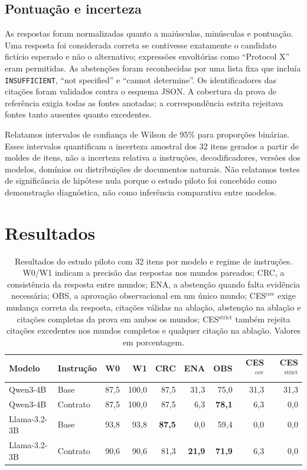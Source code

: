 \documentclass[10pt,twocolumn]{article}
\begin{document}
\subsection{Pontuação e incerteza}

As respostas foram normalizadas quanto a maiúsculas, minúsculas e pontuação. Uma resposta foi considerada correta se contivesse exatamente o candidato fictício esperado e não o alternativo; expressões envoltórias como ``Protocol X'' eram permitidas. As abstenções foram reconhecidas por uma lista fixa que incluía \texttt{INSUFFICIENT}, ``not specified'' e ``cannot determine''. Os identificadores das citações foram validados contra o esquema JSON. A cobertura da prova de referência exigia todas as fontes anotadas; a correspondência estrita rejeitava fontes tanto ausentes quanto excedentes.

Relatamos intervalos de confiança de Wilson de 95\% para proporções binárias. Esses intervalos quantificam a incerteza amostral dos 32 itens gerados a partir de moldes de itens, não a incerteza relativa a instruções, decodificadores, versões dos modelos, domínios ou distribuições de documentos naturais. Não relatamos testes de significância de hipótese nula porque o estudo piloto foi concebido como demonstração diagnóstica, não como inferência comparativa entre modelos.

\section{Resultados}

\begin{table}[t]
\centering
\small
\setlength{\tabcolsep}{5.2pt}
\caption{Resultados do estudo piloto com 32 itens por modelo e regime de instruções. W0/W1 indicam a precisão das respostas nos mundos pareados; CRC, a consistência da resposta entre mundos; ENA, a abstenção quando falta evidência necessária; OBS, a aprovação observacional em um único mundo; CES$^{\mathrm{cov}}$ exige mudança correta da resposta, citações válidas na ablação, abstenção na ablação e citações completas da prova em ambos os mundos; CES$^{\mathrm{strict}}$ também rejeita citações excedentes nos mundos completos e qualquer citação na ablação. Valores em porcentagem.}
\label{tab:main}
\begin{tabular}{llrrrrrrr}
\toprule
Modelo & Instrução & W0 & W1 & CRC & ENA & OBS & CES$^{\mathrm{cov}}$ & CES$^{\mathrm{strict}}$\\
\midrule
Qwen3-4B & Base & 87,5 & 100,0 & 87,5 & 31,3 & 75,0 & 31,3 & 31,3\\
Qwen3-4B & Contrato & 87,5 & 100,0 & 87,5 & 6,3 & \textbf{78,1} & 6,3 & 0,0\\
Llama-3.2-3B & Base & 93,8 & 93,8 & \textbf{87,5} & 0,0 & 59,4 & 0,0 & 0,0\\
Llama-3.2-3B & Contrato & 90,6 & 90,6 & 81,3 & \textbf{21,9} & \textbf{71,9} & 6,3 & 0,0\\
\bottomrule
\end{tabular}
\end{table}
\end{document}
